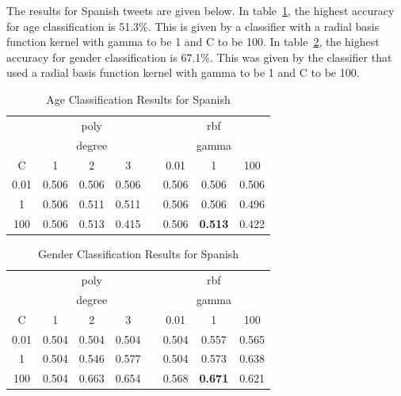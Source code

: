 \documentclass{llncs}
\begin{document}
The results for Spanish tweets are given below. In table~\ref{SpanishAge}, the highest accuracy for age classification is 51.3\%. This is given by a classifier with a radial basis function kernel with gamma to be 1 and C to be 100. In table~\ref{SpanishGender}, the highest accuracy for gender classification is 67.1\%. This was given by the classifier that used a radial basis function kernel with gamma to be 1 and C to be 100. 
\begin{table}[!htbp]
\centering
\caption{Age Classification Results for Spanish}
\label{SpanishAge}
\begin{tabular}{cccccccc}
\toprule
     & \multicolumn{3}{c}{poly}   &  & \multicolumn{3}{c}{rbf}        \\
     & \multicolumn{3}{c}{degree} &  & \multicolumn{3}{c}{gamma}      \\
C    & 1       & 2       & 3      &  & 0.01  & 1              & 100   \\
\midrule
0.01 & 0.506   & 0.506   & 0.506  &  & 0.506 & 0.506          & 0.506 \\
1    & 0.506   & 0.511   & 0.511  &  & 0.506 & 0.506          & 0.496 \\
100  & 0.506   & 0.513   & 0.415  &  & 0.506 & \textbf{0.513} & 0.422 \\
\bottomrule
\end{tabular}
\end{table}

\begin{table}[!htbp]
\centering
\caption{Gender Classification Results for Spanish}
\label{SpanishGender}
\begin{tabular}{cccccccc}
\toprule
     & \multicolumn{3}{c}{poly}   &  & \multicolumn{3}{c}{rbf}        \\
     & \multicolumn{3}{c}{degree} &  & \multicolumn{3}{c}{gamma}      \\
C    & 1       & 2       & 3      &  & 0.01  & 1              & 100   \\
\midrule
0.01 & 0.504   & 0.504   & 0.504  &  & 0.504 & 0.557          & 0.565 \\
1    & 0.504   & 0.546   & 0.577  &  & 0.504 & 0.573          & 0.638 \\
100  & 0.504   & 0.663   & 0.654  &  & 0.568 & \textbf{0.671} & 0.621 \\
\bottomrule
\end{tabular}
\end{table}
\end{document}
